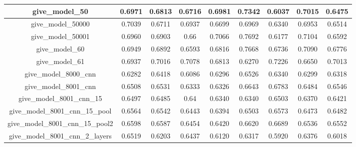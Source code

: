 \begin{table}[!h]
\begin{tabular}{|c|c|c|c|c|c|c|c|c|}
        give\_model\_50                   & 0.6971                        & 0.6813                         & 0.6716                      & 0.6981                  & 0.7342 & 0.6037 & 0.7015 & 0.6475 \\ \hline
        give\_model\_50000                & 0.7039                        & 0.6711                         & 0.6937                      & 0.6699                  & 0.6969 & 0.6340 & 0.6953 & 0.6514 \\ \hline
        give\_model\_50001                & 0.6960                        & 0.6903                         & 0.66                        & 0.7066                  & 0.7692 & 0.6177 & 0.7104 & 0.6592 \\ \hline
        give\_model\_60                   & 0.6949                        & 0.6892                         & 0.6593                      & 0.6816                  & 0.7668 & 0.6736 & 0.7090 & 0.6776 \\ \hline
        give\_model\_61                   & 0.6937                        & 0.7016                         & 0.7078                      & 0.6813                  & 0.6270 & 0.7226 & 0.6650 & 0.7013 \\ \hline
        give\_model\_8000\_cnn            & 0.6282                        & 0.6418                         & 0.6086                      & 0.6296                  & 0.6526 & 0.6340 & 0.6299 & 0.6318 \\ \hline
        give\_model\_8001\_cnn            & 0.6508                        & 0.6531                         & 0.6333                      & 0.6326                  & 0.6643 & 0.6783 & 0.6484 & 0.6546 \\ \hline
        give\_model\_8001\_cnn\_15        & 0.6497                        & 0.6485                         & 0.64                        & 0.6340                  & 0.6340 & 0.6503 & 0.6370 & 0.6421 \\ \hline
        give\_model\_8001\_cnn\_15\_pool  & 0.6564                        & 0.6542                         & 0.6443                      & 0.6394                  & 0.6503 & 0.6573 & 0.6473 & 0.6482 \\ \hline
        give\_model\_8001\_cnn\_15\_pool2 & 0.6598                        & 0.6587                         & 0.6454                      & 0.6420                  & 0.6620 & 0.6689 & 0.6536 & 0.6552 \\ \hline
        give\_model\_8001\_cnn\_2\_layers & 0.6519                        & 0.6203                         & 0.6437                      & 0.6120                  & 0.6317 & 0.5920 & 0.6376 & 0.6018 \\ \hline

\end{tabular}
\end{table}

